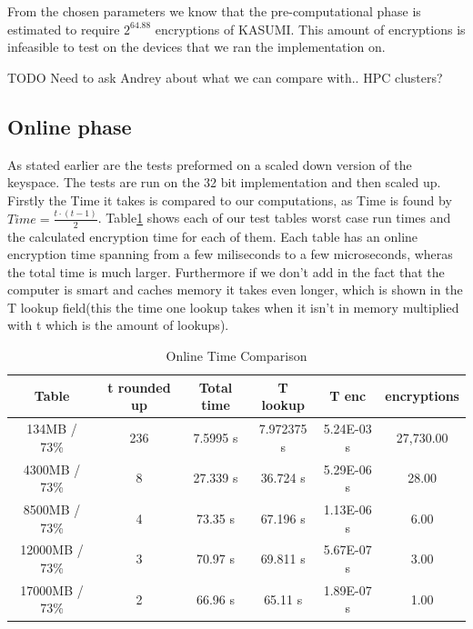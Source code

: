 From the chosen parameters we know that the pre-computational phase is
estimated to require $2^{64.88}$ encryptions of KASUMI. This amount of encryptions
is infeasible to test on the devices that we ran the
 implementation on.

TODO Need to ask Andrey about what we can compare with.. HPC clusters?

\subsection{Online phase}
As stated earlier are the tests preformed on a scaled down version of the keyspace.
The tests are run on the 32 bit implementation and then scaled up.
Firstly the Time it takes is compared to our computations, as Time is found by $Time=\frac{t\cdot(t-1)}{2}$.
Table\ref{tab:OnlineT} shows each of our test tables worst case run times and the calculated encryption time for each of them.
Each  table has an online encryption time spanning from a few miliseconds to a few microseconds, wheras the total time is  much larger.
Furthermore if we don't add in the fact that the computer is smart and caches memory it takes even longer, which is shown in the T lookup field(this the time one lookup takes when it isn't in memory multiplied with t which is the amount of lookups).
\begin{table}[H]
\centering
\caption{Online Time Comparison}
\label{tab:OnlineT}
\begin{tabular}{|c|ccccc}
\hline
Table          & \multicolumn{1}{c|}{t rounded up} & \multicolumn{1}{c|}{Total time} & \multicolumn{1}{c|}{T lookup} & \multicolumn{1}{c|}{T enc} & \multicolumn{1}{c|}{encryptions} \\ \hline
134MB / 73\%   & 236                           & 7.5995 s                        & 7.972375 s                    & 5.24E-03 s                 & 27,730.00                        \\ \cline{1-1}
4300MB / 73\%  & 8                             & 27.339 s                        & 36.724 s                      & 5.29E-06 s                 & 28.00                            \\ \cline{1-1}
8500MB / 73\%  & 4                             & 73.35 s                         & 67.196 s                      & 1.13E-06 s                 & 6.00                             \\ \cline{1-1}
12000MB / 73\% & 3                             & 70.97 s                         & 69.811 s                      & 5.67E-07 s                 & 3.00                             \\ \cline{1-1}
17000MB / 73\%  & 2                             & 66.96 s                         & 65.11 s                       & 1.89E-07 s                 & 1.00                             \\ \cline{1-1}
\end{tabular}
\end{table}
